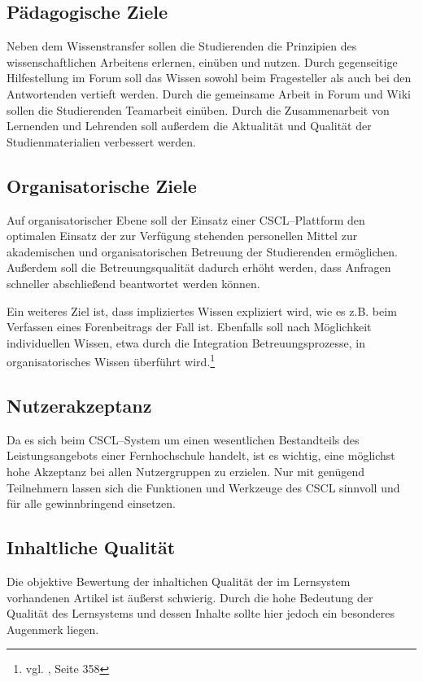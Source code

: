 \subsection{Pädagogische Ziele} %
\label{sub:padagogische_ziele}
Neben dem Wissenstransfer sollen die Studierenden die Prinzipien des wissenschaftlichen Arbeitens erlernen, einüben und nutzen. Durch gegenseitige Hilfestellung im Forum soll das Wissen sowohl beim Fragesteller als auch bei den Antwortenden vertieft werden. Durch die gemeinsame Arbeit in Forum und Wiki sollen die Studierenden Teamarbeit einüben. Durch die Zusammenarbeit von Lernenden und Lehrenden soll außerdem die Aktualität und Qualität der Studienmaterialien verbessert werden.

\subsection{Organisatorische Ziele} %
\label{sub:organisatorische_ziele}
Auf organisatorischer Ebene soll der Einsatz einer CSCL–Plattform den optimalen Einsatz der zur Verfügung stehenden personellen Mittel zur akademischen und organisatorischen Betreuung der Studierenden ermöglichen. Außerdem soll die Betreuungsqualität dadurch erhöht werden, dass Anfragen schneller abschließend beantwortet werden können. 

Ein weiteres Ziel ist, dass impliziertes Wissen expliziert wird, wie es z.B. beim Verfassen eines Forenbeitrags der Fall ist. Ebenfalls soll nach Möglichkeit individuellen Wissen, etwa durch die Integration Betreuungsprozesse, in organisatorisches Wissen überführt wird.\footnote{vgl. \cite{lws}, Seite 358}

\subsection{Nutzerakzeptanz} %
\label{sub:nutzerakzeptanz}
Da es sich beim \ac{CSCL}–System um einen wesentlichen Bestandteils des Leistungsangebots einer Fernhochschule handelt, ist es wichtig, eine möglichst hohe Akzeptanz bei allen Nutzergruppen zu erzielen. Nur mit genügend Teilnehmern lassen sich die Funktionen und Werkzeuge des \ac{CSCL} sinnvoll und für alle gewinnbringend einsetzen.

\subsection{Inhaltliche Qualität} %
\label{sub:inhaltliche_qualitat}
Die objektive Bewertung der inhaltichen Qualität der im Lernsystem vorhandenen Artikel ist äußerst schwierig. Durch die hohe Bedeutung der Qualität des Lernsystems und dessen Inhalte sollte hier jedoch ein besonderes Augenmerk liegen.


